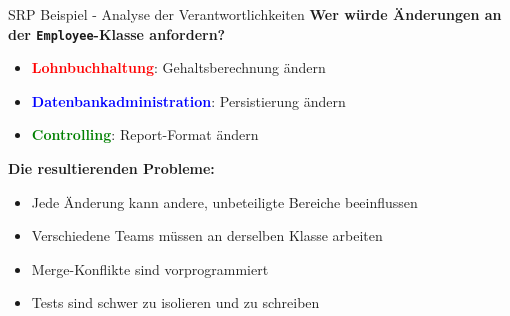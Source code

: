 \begin{frame}{SRP Beispiel - Analyse der Verantwortlichkeiten}
  \textbf{Wer würde Änderungen an der \texttt{Employee}-Klasse anfordern?}
  \begin{itemize}
    \item \textcolor{red}{\textbf{Lohnbuchhaltung}}: Gehaltsberechnung ändern
    \item \textcolor{blue}{\textbf{Datenbankadministration}}: Persistierung ändern
    \item \textcolor{green}{\textbf{Controlling}}: Report-Format ändern
  \end{itemize}

  \textbf{Die resultierenden Probleme:}
  \begin{itemize}
    \item Jede Änderung kann andere, unbeteiligte Bereiche beeinflussen
    \item Verschiedene Teams müssen an derselben Klasse arbeiten
    \item Merge-Konflikte sind vorprogrammiert
    \item Tests sind schwer zu isolieren und zu schreiben
  \end{itemize}
\end{frame}

